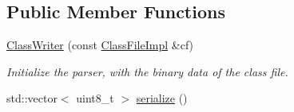 \subsection*{Public Member Functions}
\begin{DoxyCompactItemize}
\item 
\hyperlink{classClassWriter_a4335e4ecbd5dfe24d08137201a87a298}{Class\+Writer} (const \hyperlink{classClassFileImpl}{Class\+File\+Impl} \&cf)
\begin{DoxyCompactList}\small\item\em Initialize the parser, with the binary {\ttfamily data} of the class file. \end{DoxyCompactList}\item 
std\+::vector$<$ uint8\+\_\+t $>$ \hyperlink{classClassWriter_a7be4d13b5665b1e85a8a350ec181951c}{serialize} ()
\end{DoxyCompactItemize}
